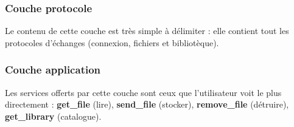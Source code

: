 \documentclass[10pt,a4paper]{article}
\begin{document}
\subsubsection{Couche protocole}
Le contenu de cette couche est très simple à délimiter : elle contient tout les protocoles d'échanges (connexion, fichiers et bibliotèque).
\subsubsection{Couche application}
Les services offerts par cette couche sont ceux que l'utilisateur voit le plus directement : \textbf{get\_file} (lire), \textbf{send\_file} (stocker), \textbf{remove\_file} (détruire), \textbf{get\_library} (catalogue).
\end{document}
